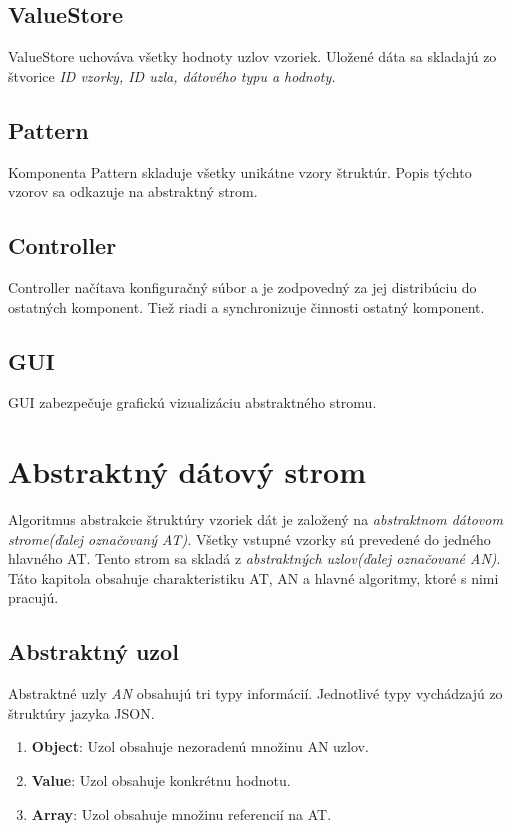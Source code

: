 \subsection*{ValueStore}
ValueStore uchováva všetky hodnoty uzlov vzoriek. Uložené dáta sa skladajú zo štvorice \textit{ID vzorky, ID uzla, dátového typu a hodnoty.}  
\subsection*{Pattern}
Komponenta Pattern skladuje všetky unikátne vzory štruktúr. Popis týchto vzorov sa odkazuje na abstraktný strom.
\subsection*{Controller}
Controller načítava konfiguračný súbor a je zodpovedný za jej distribúciu do ostatných komponent. Tiež riadi a synchronizuje činnosti ostatný komponent.
\subsection*{GUI}
GUI zabezpečuje grafickú vizualizáciu abstraktného stromu.  
\section{Abstraktný dátový strom} 
Algoritmus abstrakcie štruktúry vzoriek dát je založený na \textit{abstraktnom dátovom strome(ďalej označovaný AT).} Všetky vstupné vzorky sú prevedené do jedného hlavného AT. Tento strom sa skladá z \textit{abstraktných uzlov(ďalej označované AN)}. Táto kapitola obsahuje charakteristiku AT, AN a hlavné algoritmy, ktoré s nimi pracujú. 
\subsection*{Abstraktný uzol}
Abstraktné uzly \textit{AN} obsahujú tri typy informácií. Jednotlivé typy vychádzajú zo štruktúry jazyka JSON.   
\begin{enumerate}
	\item{\textbf{Object}: Uzol obsahuje nezoradenú množinu AN uzlov. 
	}	
	\item{\textbf{Value}: Uzol obsahuje konkrétnu hodnotu. 
	}	
	\item{\textbf{Array}: Uzol obsahuje množinu referencií na AT. 
	}		
	
\end{enumerate}
